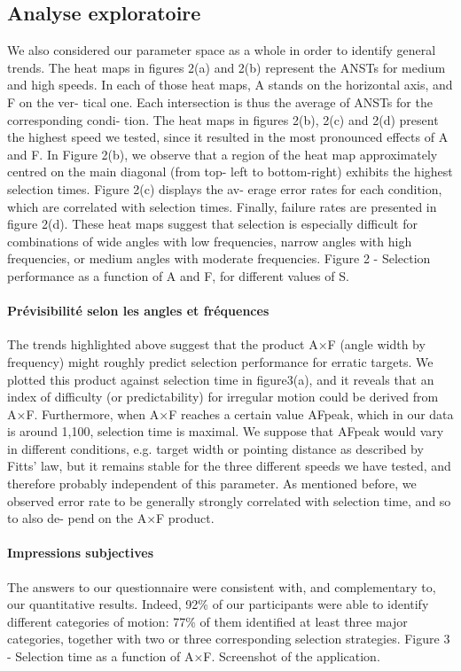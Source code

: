\subsection{Analyse exploratoire}
We also considered our parameter space as a whole in order to identify general trends.
The heat maps in figures 2(a) and 2(b) represent the ANSTs for medium and high
speeds. In each of those heat maps, A stands on the horizontal axis, and F on the ver-
tical one. Each intersection is thus the average of ANSTs for the corresponding condi-
tion. The heat maps in figures 2(b), 2(c) and 2(d) present the highest speed we tested,
since it resulted in the most pronounced effects of A and F. In Figure 2(b), we observe
that a region of the heat map approximately centred on the main diagonal (from top-
left to bottom-right) exhibits the highest selection times. Figure 2(c) displays the av-
erage error rates for each condition, which are correlated with selection times. Finally,
failure rates are presented in figure 2(d).
These heat maps suggest that selection is especially difficult for combinations of
wide angles with low frequencies, narrow angles with high frequencies, or medium
angles with moderate frequencies.
Figure 2 - Selection performance as a function of A and F, for different values of S.

\paragraph{Prévisibilité selon les angles et fréquences}
The trends highlighted above suggest that the product A×F (angle width by frequency) might roughly predict selection performance for erratic targets. We plotted this product against selection time in figure3(a), and it reveals that an index of difficulty (or predictability) for irregular motion could be derived from A×F. Furthermore, when A×F reaches a certain value AFpeak,
which in our data is around 1,100, selection time is maximal. We suppose that AFpeak
would vary in different conditions, e.g. target width or pointing distance as described
by Fitts’ law, but it remains stable for the three different speeds we have tested, and
therefore probably independent of this parameter. As mentioned before, we observed
error rate to be generally strongly correlated with selection time, and so to also de-
pend on the A×F product.

\paragraph{Impressions subjectives}
The answers to our questionnaire were consistent with, and complementary to, our quantitative results. Indeed, 92\%{} of our participants were able to identify different categories of motion: 77\%{} of them identified at least three major categories, together with two or three corresponding selection strategies.
Figure 3 - Selection time as a function of A×F. Screenshot of the application.

